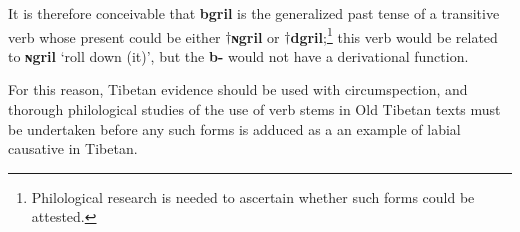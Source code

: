 \documentclass[oneside,a4paper,11pt]{article}
\newcommand{\ipa}[1]{\textbf{{\phon\mbox{#1}}}} %
\newcommand{\forme}[2]{\ipa{#1} `#2'}
\begin{document}
It is therefore conceivable that  \ipa{bgril} is the generalized past tense of a transitive verb whose present could be either $\dagger$\ipa{ɴgril} or $\dagger$\ipa{dgril};\footnote{Philological research is needed to ascertain whether such forms could be attested.} this verb would be related to \forme{ɴgril}{roll down (it)}, but the \ipa{b-} would not have a derivational function. 
 
For this reason, Tibetan evidence should be used with circumspection, and thorough philological studies of the use of verb stems in Old Tibetan texts must be undertaken before any such forms is adduced as a an example of labial causative in Tibetan.


%
%
%
\end{document}
